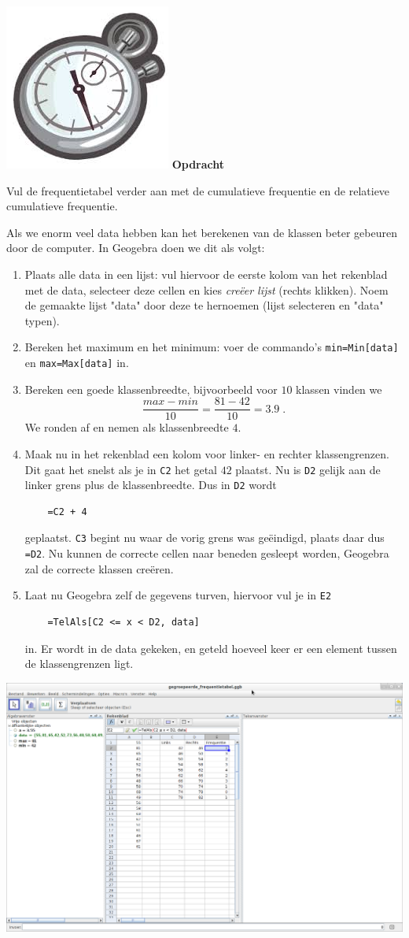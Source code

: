 \documentclass[12pt,twoside]{article}
\newcounter{nstopdracht}
\newenvironment{stopdracht}
{
  \stepcounter{nstopdracht}
  \vspace*{-0.25cm}
  \begin{minipage}{\textwidth}
  {%
  \hspace*{-0.85\marginparwidth}\includegraphics[width=0.75\marginparwidth]{stopwatch}
  \large\bf Opdracht \arabic{nstopdracht}}
}{%
  \end{minipage}
}
\begin{document}
\begin{stopdracht}
Vul de frequentietabel verder aan met de cumulatieve frequentie en de relatieve cumulatieve frequentie.
\end{stopdracht}

Als we enorm veel data hebben kan het berekenen van de klassen beter gebeuren door de computer. In Geogebra doen we dit als volgt:
\begin{enumerate}
  \item Plaats alle data in een lijst: vul hiervoor de eerste kolom van het rekenblad met de data, selecteer deze cellen en kies {\it creëer lijst} (rechts klikken). Noem de gemaakte lijst "data" door deze te hernoemen (lijst selecteren en "data" typen).
  \item Bereken het maximum en het minimum: voer de commando's \verb#min=Min[data]# en \verb#max=Max[data]# in.
  \item Bereken een goede klassenbreedte, bijvoorbeeld voor $10$ klassen vinden we $$\frac{max-min}{10}=\frac{81-42}{10}=3.9\;.$$ We ronden af en nemen als klassenbreedte $4$.
  \item Maak nu in het rekenblad een kolom voor linker- en rechter klassengrenzen. Dit gaat het snelst als je in \verb#C2# het getal $42$ plaatst. Nu is \verb#D2# gelijk aan de linker grens plus de klassenbreedte. Dus in \verb#D2# wordt 
  \begin{verbatim}
    =C2 + 4
  \end{verbatim} 
  geplaatst. \verb#C3# begint nu waar de vorig grens was geëindigd, plaats daar dus \verb#=D2#. Nu kunnen de correcte cellen naar beneden gesleept worden, Geogebra zal de correcte klassen creëren.
  \item Laat nu Geogebra zelf de gegevens turven, hiervoor vul je in \verb#E2# 
  \begin{verbatim}
    =TelAls[C2 <= x < D2, data]
  \end{verbatim}
  in. Er wordt in de data gekeken, en geteld hoeveel keer er een element tussen de klassengrenzen ligt.
\end{enumerate}

\begin{center}
  \includegraphics[width=14cm]{gg-gegroepeerde_frequentietabel}
\end{center}
\end{document}
